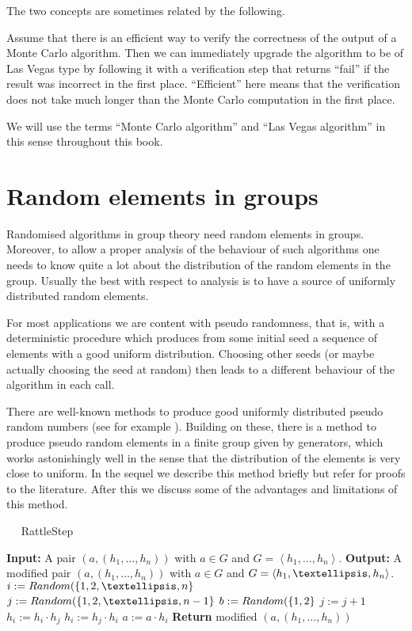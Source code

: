 The two concepts are sometimes related by the following.

\begin{Rem}
Assume that there is an efficient way to verify the correctness of the output
of a Monte Carlo algorithm. Then we can immediately upgrade the
algorithm to be of Las Vegas type by following it with a verification
step that returns ``fail'' if the result was incorrect in the first
place. ``Efficient'' here means that the verification does not take
much longer than the Monte Carlo computation in the first place.
\end{Rem}

We will use the terms ``Monte Carlo algorithm'' and ``Las Vegas
algorithm'' in this sense throughout this book.

\section{Random elements in groups}
\label{randomelts}

Randomised algorithms in group theory need random elements in groups.
Moreover, to allow a proper analysis of the behaviour of such
algorithms one needs to know quite a lot about the distribution of
the random elements in the group. Usually the best with respect to
analysis is to have a source of uniformly distributed random elements.

For most applications we are content with pseudo randomness, that is, with a
deterministic procedure which produces from some initial seed a sequence of 
elements with a good uniform distribution. Choosing other seeds (or
maybe actually choosing the seed at random) then leads to a different
behaviour of the algorithm in each call.

There are well-known methods to produce good uniformly distributed
pseudo random numbers (see for example \cite[Chapter~3]{AOCP2}).
Building on these, there is a method to produce pseudo random elements
in a finite group given by generators, which works astonishingly
well in the sense that the distribution of the elements is very close
to uniform. In the sequel we describe this method briefly but refer
for proofs to the literature. After this we discuss some of the
advantages and limitations of this method.

\begin{algorithm}
\caption{$\quad$ \sc RattleStep}
\label{rattlestep}
\begin{algorithmic}
\STATE \textbf{Input:} A pair $(a,(h_1, \ldots, h_n))$ with $a \in G$
and $G = \left< h_1, \ldots, h_n \right>$.
\STATE \textbf{Output:} A modified pair $(a,(h_1, \ldots, h_n))$ with $a \in G$
and $G = \left< \smash{h_1, \ldots, h_n} \right>$.
\vspace*{2mm}
\STATE $i := \textsc{Random}(\{ 1,2,\ldots,n\}$
\STATE $j := \textsc{Random}(\{1,2,\ldots,n-1\}$
\STATE $b := \textsc{Random}(\{1,2\}$
    \STATE $j := j + 1$
\ENDIF
{}
    \STATE $h_i := h_i \cdot h_j$
\ELSE
    \STATE $h_i := h_j \cdot h_i$
\ENDIF
\STATE $a := a \cdot h_i$
\STATE \textbf{Return} modified $(a,(h_1,\ldots,h_n))$
\end{algorithmic}
\end{algorithm}

